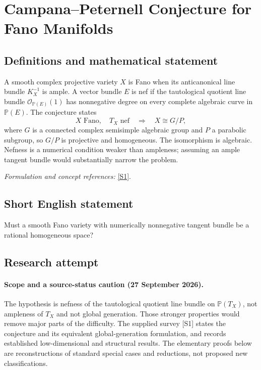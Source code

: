 \documentclass[11pt]{article}
\begin{document}
\section*{\texorpdfstring{Campana–Peternell Conjecture for Fano Manifolds}{Campana–Peternell Conjecture for Fano Manifolds}}\label{30005487}
\subsection{Definitions and mathematical statement}
A smooth complex projective variety $X$ is Fano when its anticanonical line bundle $K_X^{-1}$ is ample. A vector bundle $E$ is nef if the tautological quotient line bundle $\mathcal O_{{\mathbb{P}}(E)}(1)$ has nonnegative degree on every complete algebraic curve in ${\mathbb{P}}(E)$. The conjecture states
\[
 X\text{ Fano},\quad T_X\text{ nef}
 \quad\Longrightarrow\quad X\cong G/P,
\]
where $G$ is a connected complex semisimple algebraic group and $P$ a parabolic subgroup, so $G/P$ is projective and homogeneous. The isomorphism is algebraic. Nefness is a numerical condition weaker than ampleness; assuming an ample tangent bundle would substantially narrow the problem.
\par\smallskip\textit{Formulation and concept references:} \href{https://arxiv.org/abs/1407.6483}{[S1]}.

\subsection{Short English statement}
Must a smooth Fano variety with numerically nonnegative tangent bundle be a rational homogeneous space?
\subsection{Research attempt}

\paragraph{Scope and a source-status caution (27 September 2026).}
The hypothesis is nefness of the tautological quotient line bundle on
$\mathbb P(T_X)$, not ampleness of $T_X$ and not global generation.
Those stronger properties would remove major parts of the difficulty.
The supplied survey [S1] states the conjecture and its equivalent
global-generation formulation, and records established low-dimensional
and structural results. The elementary proofs below are reconstructions
of standard special cases and reductions, not proposed new classifications.
\end{document}
